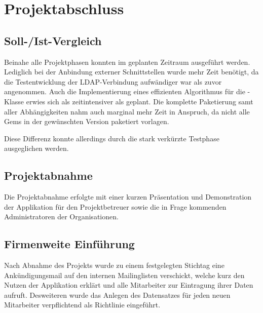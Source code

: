 \section{Projektabschluss}
\label{sec:Projektabschluss}

\subsection{Soll-/Ist-Vergleich}
\label{sec:SollIstVergleich}
Beinahe alle Projektphasen konnten im geplanten Zeitraum ausgeführt werden. Lediglich bei
der Anbindung externer Schnittstellen wurde mehr Zeit benötigt, da die Testentwicklung der
\acs{LDAP}-Verbindung aufwändiger war als zuvor angenommen. Auch die Implementierung eines
effizienten Algorithmus für die -Klasse erwies sich als zeitintensiver als geplant.
Die komplette Paketierung samt aller Abhängigkeiten nahm auch marginal mehr Zeit in Anspruch, da
nicht alle Gems in der gewünschten Version paketiert vorlagen.

Diese Differenz konnte allerdings durch die stark verkürzte Testphase ausgeglichen werden.


\subsection{Projektabnahme}
\label{sec:Projektabnahme}
Die Projektabnahme erfolgte mit einer kurzen Präsentation und Demonstration der Applikation für den
Projektbetreuer sowie die in Frage kommenden Administratoren der Organisationen.

\subsection{Firmenweite Einführung}
\label{Firmenweite Einführung}
Nach Abnahme des Projekts wurde zu einem festgelegten Stichtag eine Ankündigungsmail auf den
internen Mailinglisten verschickt, welche kurz den Nutzen der Applikation erklärt und alle
Mitarbeiter zur Eintragung ihrer Daten aufruft. Desweiteren wurde das Anlegen des Datensatzes für
jeden neuen Mitarbeiter verpflichtend als Richtlinie eingeführt.
